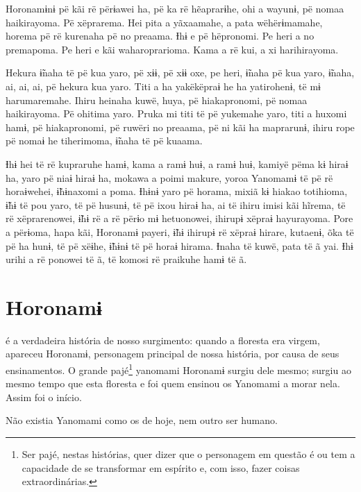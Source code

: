 Horonamɨnɨ pë kãi rë përɨawei ha, pë ka rë hẽaprarɨhe, ohi a wayunɨ, pë
nomaa haikirayoma. Pë xëprarema. Hei pita a yãxaamahe, a pata
wëhërɨmamahe, horema pë rë kurenaha pë no preaama. Ɨhɨ e pë hëpronomi.
Pe heri a no premapoma. Pe heri e kãi waharoprarioma. Kama a rë kui, a
xi harihirayoma. 

Hekura ɨ̃naha të pë kua yaro, pë xɨɨ, pë xɨɨ oxe, pe heri, ɨ̃naha pë kua
 yaro, ɨ̃naha, ai, ai, ai, pë hekura kua yaro. Titi a ha yakëkëpraɨ he ha
 yatirohenɨ, të mɨ harumaremahe. Ihiru heinaha kuwë, huya, pë
 hiakapronomi, pë nomaa haikirayoma. Pë ohitima yaro. Pruka mi titi të pë
 yukemahe yaro, titi a huxomi hamɨ, pë hiakapronomi, pë ruwëri no
 preaama, pë ni kãi ha maprarunɨ, ihiru rope pë nomaɨ he tiherimoma,
 ɨ̃naha të pë kuaama. 

Ɨhɨ hei të rë kupraruhe hamɨ, kama a ramɨ huɨ, a ramɨ huɨ, kamiyë pëma
kɨ hiraɨ ha, yaro pë niaɨ hiraɨ ha, mokawa a poimi makure, yoroa
Yanomamɨ të pë rë horaɨwehei, ɨ̃hɨnaxomi a poma. Ɨhɨnɨ yaro pë horama,
mixiã kɨ hiakao totihioma, ɨ̃hɨ të pou yaro, të pë husunɨ, të pë ixou
hiraɨ ha, ai të ihiru imisi kãi hĩrema, të rë xëprarenowei, ɨ̃hɨ rë a rë
përɨo mɨ hetuonowei, ihirupɨ xëpraɨ hayurayoma. Pore a përɨoma, hapa
kãi, Horonamɨ payeri, ɨ̃hɨ ihirupɨ rë xëpraɨ hirare, kutaenɨ, õka të pë
ha hunɨ, të pë xëɨhe, ɨ̃hɨnɨ të pë horaɨ hirama. Ɨnaha të kuwë, pata të ã
yai. Ɨhɨ urihi a rë ponowei të ã, të komosi rë praikuhe hamɨ të ã.

\chapter{Horonamɨ}
 

 é a verdadeira história de nosso surgimento: quando a floresta era
virgem, apareceu Horonamɨ, personagem principal de nossa história, por
causa de seus ensinamentos. O grande pajé\footnote{Ser pajé, nestas histórias, quer dizer que o personagem em questão é ou tem a capacidade de se transformar em espírito e, com isso, fazer coisas
extraordinárias.}  yanomami Horonamɨ surgiu dele mesmo; surgiu ao mesmo tempo que esta floresta e
foi quem ensinou os Yanomami a morar nela. Assim foi o início. 

Não existia Yanomami como os de hoje, nem outro ser humano. 

